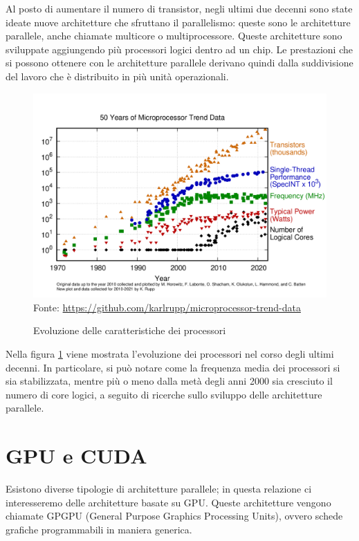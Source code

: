 \documentclass[12pt,a4paper,openright,twoside]{report}
\begin{document}
Al posto di aumentare il numero di transistor, negli ultimi due decenni sono state ideate nuove architetture che sfruttano il parallelismo: queste sono le architetture parallele, anche chiamate multicore o multiprocessore. Queste architetture sono sviluppate aggiungendo più processori logici dentro ad un chip. Le prestazioni che si possono ottenere con le architetture parallele derivano quindi dalla suddivisione del lavoro che è distribuito in più unità operazionali.

\begin{figure}[h]
    \centering
    \def\stackalignment{r}
    \stackunder
        {\includegraphics[width=\textwidth]{50-years-processor-trend.png}}
        {\scriptsize Fonte: \url{https://github.com/karlrupp/microprocessor-trend-data}}
    \caption{Evoluzione delle caratteristiche dei processori}
    \label{img:trend_proc}
\end{figure}

Nella figura \ref{img:trend_proc} viene mostrata l'evoluzione dei processori nel corso degli ultimi decenni. In particolare, si può notare come la frequenza media dei processori si sia stabilizzata, mentre più o meno dalla metà degli anni 2000 sia cresciuto il numero di core logici, a seguito di ricerche sullo sviluppo delle architetture parallele.

\section{GPU e CUDA}

Esistono diverse tipologie di architetture parallele; in questa relazione ci interesseremo delle architetture basate su GPU. Queste architetture vengono chiamate GPGPU (General Purpose Graphics Processing Units), ovvero schede grafiche programmabili in maniera generica.
\end{document}

